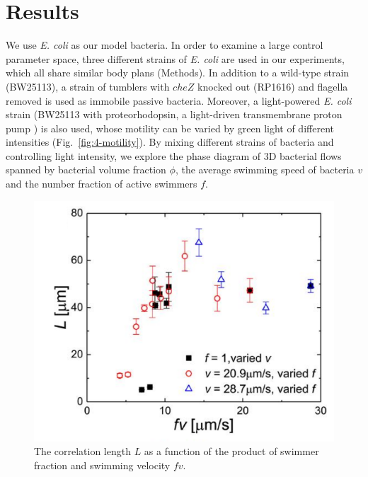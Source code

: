 \section{Results}

We use  \textit{E. coli} as our model bacteria. In order to examine a large control parameter space, three different strains of \textit{E. coli} are used in our experiments, which all share similar body plans (Methods). In addition to a wild-type strain (BW25113), a strain of tumblers with $cheZ$ knocked out (RP1616) and flagella removed is used as immobile passive bacteria. Moreover, a light-powered
\textit{E. coli} strain (BW25113 with proteorhodopsin, a light-driven transmembrane proton pump \cite{Walter2007}) is also used, whose motility can be varied by green light of different intensities (Fig.~\ref{fig:4-motility}). By mixing different strains of bacteria and controlling light intensity, we explore the phase diagram of 3D bacterial flows spanned by bacterial volume fraction $\phi$, the average swimming speed of bacteria $v$ and the number fraction of active swimmers $f$.

\begin{figure}[!ht]
	\begin{center}
	\includegraphics[width=4 in]{Figs/4-Emergence/S2C.pdf}
	\end{center}
	\caption[The correlation length as a function of the product of swimmer fraction and swimming velocity]
	{
	The correlation length $L$ as a function of the product of swimmer fraction and swimming velocity $fv$.
  }
	\label{fig:4-correlation-length}
\end{figure}

